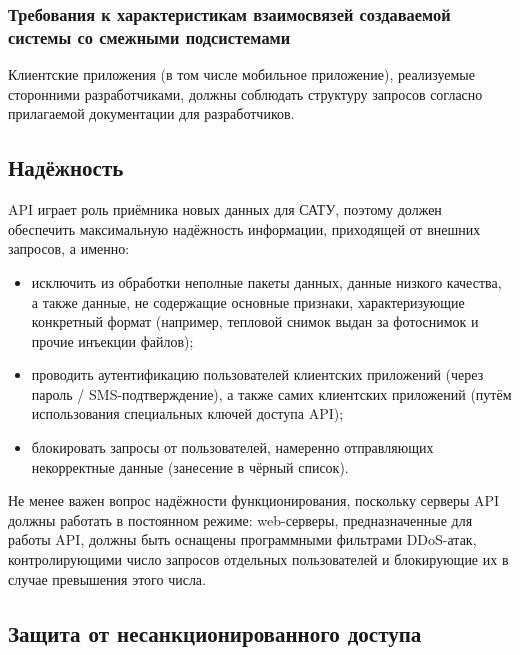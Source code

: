 \subsubsection{\enskip \nohyphens{Требования к характеристикам взаимосвязей создаваемой системы со смежными подсистемами}}

\par

	Клиентские приложения (в том числе мобильное приложение), реализуемые сторонними разработчиками, должны соблюдать структуру запросов согласно прилагаемой документации для разработчиков.

\subsection{\enskip Надёжность}

\par

	API играет роль приёмника новых данных для САТУ, поэтому должен обеспечить максимальную надёжность информации, приходящей от внешних запросов, а именно:

	\begin{itemize}
		\item исключить из обработки неполные пакеты данных, данные низкого качества, а также данные, не содержащие основные признаки, характеризующие конкретный формат (например, тепловой снимок выдан за фотоснимок и прочие инъекции файлов);
		\item проводить аутентификацию пользователей клиентских приложений (через пароль / SMS-подтверждение), а также самих клиентских приложений (путём использования специальных ключей доступа API);
		\item блокировать запросы от пользователей, намеренно отправляющих некорректные данные (занесение в чёрный список).
	\end{itemize}
	
	Не менее важен вопрос надёжности функционирования, поскольку серверы API должны работать в постоянном режиме: web-серверы, предназначенные для работы API, должны быть оснащены программными фильтрами DDoS-атак, контролирующими число запросов отдельных пользователей и блокирующие их в случае превышения этого числа.

\subsection{\enskip Защита от несанкционированного доступа}

\par

